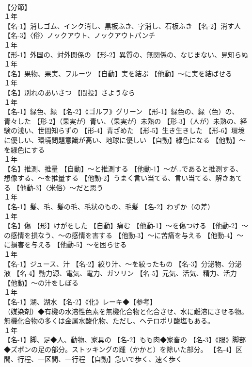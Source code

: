 \documentclass[8pt]{extreport}
\begin{document}
\begin{CJK}{UTF8}{min}
\\	【分節】
\\	１年	
\\	【名-1】消しゴム、インク消し、黒板ふき、字消し、石板ふき 【名-2】消す人 【名-3】〈俗〉ノックアウト、ノックアウトパンチ
\\	１年	
\\	【形-1】外国の、対外関係の 【形-2】異質の、無関係の、なじまない、見知らぬ
\\	１年	
\\	【名】果物、果実、フルーツ 【自動】実を結ぶ 【他動】～に実を結ばせる
\\	１年	
\\	【名】別れのあいさつ 【間投】さようなら
\\	１年	
\\	【名-1】緑色、緑 【名-2】《ゴルフ》グリーン 【形-1】緑色の、緑（色）の、青々した 【形-2】（果実が）青い、（果実が）未熟の 【形-3】（人が）未熟の、経験の浅い、世間知らずの 【形-4】青ざめた 【形-5】生き生きした 【形-6】環境に優しい、環境問題意識が高い、地球に優しい 【自動】緑色になる 【他動】～を緑色にする
\\	１年	
\\	【名】推測、推量 【自動】～と推測する 【他動-1】～が…であると推測する、想像する、～を推量する 【他動-2】うまく言い当てる、言い当てる、解きあてる 【他動-3】〈米俗〉～だと思う
\\	１年	
\\	【名-1】髪、毛、髪の毛、毛状のもの、毛髪 【名-2】わずか（の差）
\\	１年	
\\	【名】傷 【形】けがをした 【自動】痛む 【他動-1】～を傷つける 【他動-2】～の感情を損なう、～の感情を害する 【他動-3】～に苦痛を与える 【他動-4】～に損害を与える 【他動-5】～を困らせる
\\	１年	
\\	【名-1】ジュース、汁 【名-2】絞り汁、～を絞ったもの 【名-3】分泌物、分泌液 【名-4】動力源、電気、電力、ガソリン 【名-5】元気、活気、精力、活力 【他動】～の汁をしぼる
\\	１年	
\\	【名-1】湖、湖水 【名-2】《化》レーキ◆【参考】
\\	（媒染剤）◆有機の水溶性色素を無機化合物と化合させ、水に難溶にさせる物。無機化合物の多くは金属水酸化物、ただし、ヘテロポリ酸塩もある。
\\	１年	
\\	【名-1】脚、足◆人、動物、家具の 【名-2】もも肉◆家畜の 【名-3】《服》脚部◆ズボンの足の部分。ストッキングの踵（かかと）を除いた部分。 【名-4】区間、行程、一区間、一行程 【自動】急いで歩く、速く歩く

\end{CJK}
\end{document}
